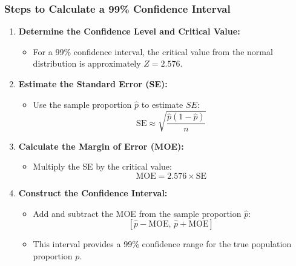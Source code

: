 \documentclass[handout]{beamer} %
\begin{document}
\begin{frame}
    \frametitle{Steps to Calculate a 99\% Confidence Interval}
    \begin{enumerate}
        \item \textbf{Determine the Confidence Level and Critical Value:}
        \begin{itemize}
            \item For a 99\% confidence interval, the critical value from the normal distribution is approximately \( Z = 2.576 \).
        \end{itemize}

        \item \textbf{Estimate the Standard Error (SE):}
        \begin{itemize}
            \item Use the sample proportion \( \hat{p} \) to estimate \( SE \):
            \[
            \text{SE} \approx \sqrt{\frac{\hat{p}(1 - \hat{p})}{n}}
            \]
        \end{itemize}

        \item \textbf{Calculate the Margin of Error (MOE):}
        \begin{itemize}
            \item Multiply the SE by the critical value:
            \[
            \text{MOE} = 2.576 \times \text{SE}
            \]
        \end{itemize}

        \item \textbf{Construct the Confidence Interval:}
        \begin{itemize}
            \item Add and subtract the MOE from the sample proportion \( \hat{p} \):
            \[
            \left[ \hat{p} - \text{MOE}, \, \hat{p} + \text{MOE} \right]
            \]
            \item This interval provides a 99\% confidence range for the true population proportion \( p \).
        \end{itemize}
    \end{enumerate}
\end{frame}
\end{document}
